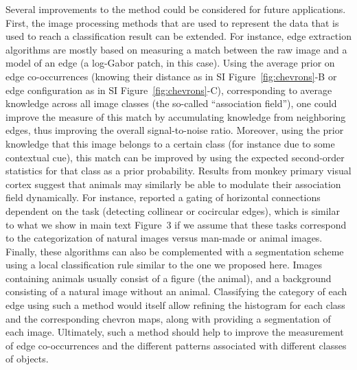 \documentclass[a4paper]{article}
\begin{document}
Several improvements to the method could be considered for future applications.
First, the image processing methods that are used to represent the data that is
used to reach a classification result can be extended. 
For instance, edge extraction algorithms are mostly based 
on measuring a match between the raw image and a model of an edge (a log-Gabor patch, in this case). 
Using the average prior on edge co-occurrences 
(knowing their distance as in SI Figure~\ref{fig:chevrons}-B 
or edge configuration as in SI Figure~\ref{fig:chevrons}-C), 
corresponding to average knowledge across all image classes (the so-called ``association field''), 
one could improve the measure of this match by accumulating knowledge from neighboring edges, 
thus improving the overall signal-to-noise ratio. 
Moreover, using the prior knowledge that this image belongs to a certain class 
(for instance due to some contextual cue), 
this match can be improved by using the expected second-order statistics 
for that class as a prior probability. 
Results from monkey primary visual cortex suggest that animals may similarly 
be able to modulate their association field dynamically.  
For instance, \textcite{McManus11} reported a gating of horizontal connections 
dependent on the task (detecting collinear or cocircular edges), 
which is similar to what we show in main text Figure~3 %
if we assume that these tasks correspond 
to the categorization of natural images versus man-made or animal images. 
Finally, these algorithms can also be complemented with a segmentation scheme 
using a local classification rule similar to the one we proposed here. 
Images containing animals usually consist of a figure (the animal), 
and a background consisting of a natural image without an animal. 
Classifying the category of each edge using such a method 
would itself allow refining the histogram for each class and the
corresponding chevron maps, along with providing a segmentation of each image.
Ultimately, such a method should help to improve the measurement of edge
co-occurrences and the different patterns associated with different classes of objects.
\end{document}
